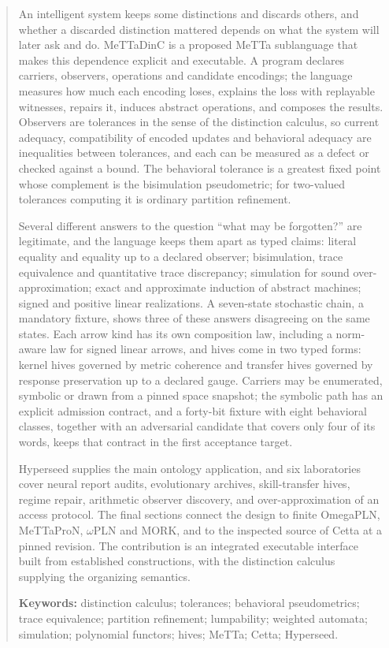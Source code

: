 \documentclass[11pt]{article}
\theoremstyle{definition}
\theoremstyle{plain}
\begin{document}
\begin{abstract}
\noindent
An intelligent system keeps some distinctions and discards others, and whether a discarded
distinction mattered depends on what the system will later ask and do. MeTTaDinC is a proposed
MeTTa sublanguage that makes this dependence explicit and executable. A program declares
carriers, observers, operations and candidate encodings; the language measures how much each
encoding loses, explains the loss with replayable witnesses, repairs it, induces abstract
operations, and composes the results. Observers are tolerances in the sense of the distinction
calculus, so current adequacy, compatibility of encoded updates and behavioral adequacy are
inequalities between tolerances, and each can be measured as a defect or checked against a
bound. The behavioral tolerance is a greatest fixed point whose complement is the bisimulation
pseudometric; for two-valued tolerances computing it is ordinary partition refinement.

Several different answers to the question ``what may be forgotten?'' are legitimate, and the
language keeps them apart as typed claims: literal equality and equality up to a declared
observer; bisimulation, trace equivalence and quantitative trace discrepancy; simulation for
sound over-approximation; exact and approximate induction of abstract machines; signed and
positive linear realizations. A seven-state stochastic chain, a mandatory fixture, shows three of
these answers disagreeing on the same states. Each arrow kind has its own composition law,
including a norm-aware law for signed linear arrows, and hives come in two typed forms: kernel
hives governed by metric coherence and transfer hives governed by response preservation up to a
declared gauge. Carriers may be enumerated, symbolic or drawn from a pinned space snapshot; the
symbolic path has an explicit admission contract, and a forty-bit fixture with eight behavioral
classes, together with an adversarial candidate that covers only four of its words, keeps that
contract in the first acceptance target.

Hyperseed supplies the main ontology application, and six laboratories cover neural report
audits, evolutionary archives, skill-transfer hives, regime repair, arithmetic observer
discovery, and over-approximation of an access protocol. The final sections connect the design to
finite OmegaPLN, MeTTaProN, $\omega$PLN and MORK, and to the inspected source of Cetta at a
pinned revision. The contribution is an integrated executable interface built from established
constructions, with the distinction calculus supplying the organizing semantics.

\medskip\noindent
\textbf{Keywords:} distinction calculus; tolerances; behavioral pseudometrics; trace equivalence;
partition refinement; lumpability; weighted automata; simulation; polynomial functors; hives;
MeTTa; Cetta; Hyperseed.
\end{abstract}
\end{document}
